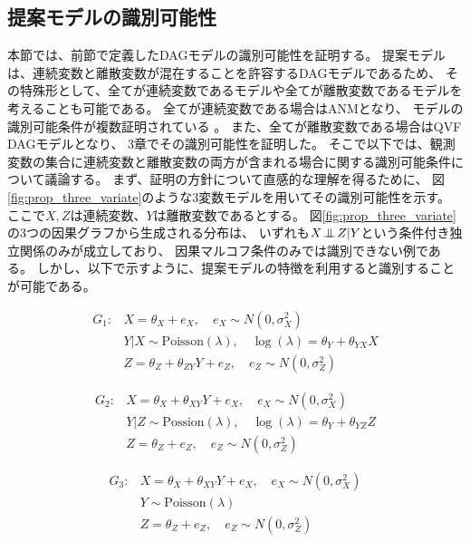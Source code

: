 
\subsection{提案モデルの識別可能性}

本節では、前節で定義したDAGモデルの識別可能性を証明する。
提案モデルは、連続変数と離散変数が混在することを許容するDAGモデルであるため、
その特殊形として、全てが連続変数であるモデルや全てが離散変数であるモデルを考えることも可能である。
全てが連続変数である場合はANMとなり、
モデルの識別可能条件が複数証明されている\cite{Shimizu2006-yu}
\cite{Hoyer2008-oo}
\cite{Peters2013-eb}
\cite{Peters2014-ro}
\cite{Park2020-ey}。
また、全てが離散変数である場合はQVF DAGモデル\cite{Park2017-hw}となり、
3章でその識別可能性を証明した。
そこで以下では、観測変数の集合に連続変数と離散変数の両方が含まれる場合に関する識別可能条件について議論する。
まず、証明の方針について直感的な理解を得るために、
図\ref{fig:prop_three_variate}のような3変数モデルを用いてその識別可能性を示す。
ここで$X,Z$は連続変数、$Y$は離散変数であるとする。
図\ref{fig:prop_three_variate}の3つの因果グラフから生成される分布は、
いずれも$X \mathop{\,\perp\!\!\!\!\!\!\perp\,} Z | Y$という条件付き独立関係のみが成立しており、
因果マルコフ条件のみでは識別できない例である。
しかし、以下で示すように、提案モデルの特徴を利用すると識別することが可能である。

\begin{align*}
  G_1 \colon & X = \theta_{X} + e_X, \quad e_X \sim N(0, \sigma_X^2) \\
             & Y|X \sim \mathrm{Poisson}(\lambda), \quad \log(\lambda) = \theta_Y + \theta_{YX}X \\
             & Z = \theta_Z + \theta_{ZY}Y + e_Z, \quad e_Z \sim N(0, \sigma_Z^2)
\end{align*}

\begin{align*}
  G_2 \colon & X = \theta_X + \theta_{XY}Y + e_X, \quad e_X \sim N(0, \sigma_X^2) \\
             & Y|Z \sim \mathrm{Possion}(\lambda), \quad \log(\lambda) = \theta_Y + \theta_{YZ}Z \\
             & Z = \theta_{Z} + e_Z, \quad e_Z \sim N(0, \sigma_Z^2)
\end{align*}

\begin{align*}
  G_3 \colon & X = \theta_X + \theta_{XY}Y + e_X, \quad e_X \sim N(0, \sigma_X^2) \\
             & Y \sim \mathrm{Poisson}(\lambda) \\
             & Z = \theta_{Z} + e_Z, \quad e_Z \sim N(0, \sigma_Z^2)
\end{align*}

